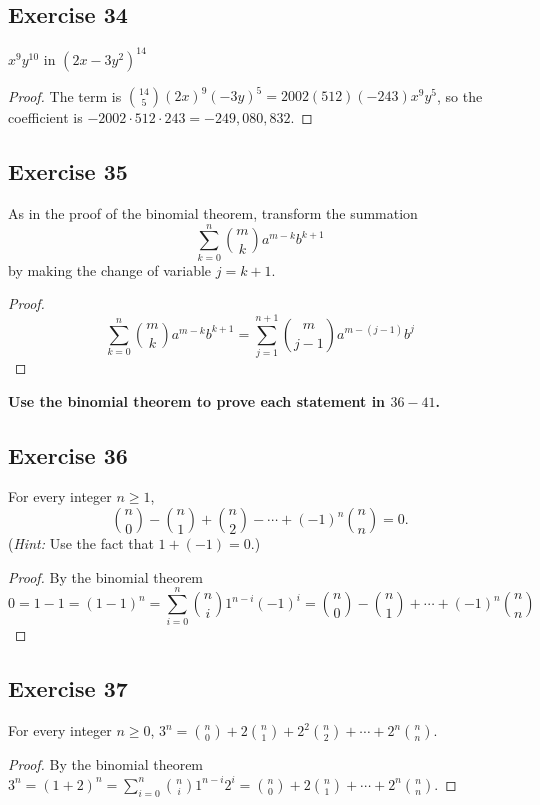 \documentclass[14pt]{extarticle}
\newcommand{\dps}{\displaystyle}
\newcommand{\cy}{\color{cyan}}
\begin{document}
\subsection{Exercise 34}
\(x^9y^{10}\) in \((2x-3y^2)^{14}\)
\begin{proof}
     The term is \(\binom{14}{5}(2x)^9(-3y)^5 = 2002(512)(-243)x^9y^5\), so the coefficient is \(-2002 \cdot 512 \cdot
     243 = -249,080,832\).
\end{proof}

\subsection{Exercise 35}
As in the proof of the binomial theorem, transform the summation
\[
     \sum_{k=0}^{n}\binom{m}{k}a^{m-k}b^{k+1}
\]
by making the change of variable \(j = k + 1\).
\begin{proof}
     \[
          \sum_{k=0}^{n}\binom{m}{k}a^{m-k}b^{k+1} = \sum_{j=1}^{n+1}\binom{m}{j-1}a^{m-(j-1)}b^j
     \]
\end{proof}

{\bf \cy Use the binomial theorem to prove each statement in \(36-41\).}

\subsection{Exercise 36}
For every integer \(n \geq 1\),
\[
     \binom{n}{0} - \binom{n}{1} + \binom{n}{2} - \cdots + (-1)^n \binom{n}{n} = 0.
\]
({\it Hint:} Use the fact that \(1 + (-1) = 0\).)

\begin{proof}
     By the binomial theorem
     \[
          0 = 1-1 = (1-1)^n = \sum_{i=0}^{n}\binom{n}{i}1^{n-i}(-1)^i = \binom{n}{0} - \binom{n}{1} + \cdots + (-1)^n \binom{n}{n}
     \]
\end{proof}

\subsection{Exercise 37}
For every integer \(n \geq 0\), \( 3^n = \binom{n}{0} + 2\binom{n}{1} + 2^2\binom{n}{2} + \cdots + 2^n\binom{n}{n}.\)

\begin{proof}
     By the binomial theorem \(\dps 3^n = (1+2)^n = \sum_{i=0}^{n}\binom{n}{i}1^{n-i}2^i = \binom{n}{0} + 2\binom{n}{1} + \cdots
     + 2^n\binom{n}{n}\).
\end{proof}
\end{document}
